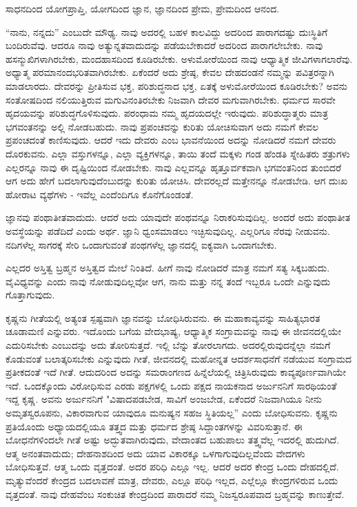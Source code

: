 ಸಾಧನದಿಂದ ಯೋಗಪ್ರಾಪ್ತಿ, ಯೋಗದಿಂದ ಜ್ಞಾನ, ಜ್ಞಾನದಿಂದ ಪ್ರೇಮ, ಪ್ರೇಮದಿಂದ ಆನಂದ.

“ನಾನು, ನನ್ನದು” ಎಂಬುದೇ ಮೌಢ್ಯ. ನಾವು ಅದರಲ್ಲಿ ಬಹಳ ಕಾಲವಿದ್ದು ಅದರಿಂದ ಪಾರಾಗದಷ್ಟು ದುಃಸ್ಥಿತಿಗೆ ಬಂದಿರುವೆವು. ಆದರೂ ನಾವು ಅತ್ಯುನ್ನತವಾದುದನ್ನು ಪಡೆಯಬೇಕಾದರೆ ಅದರಿಂದ ಪಾರಾಗಲೇಬೇಕು. ನಾವು ಹಸನ್ಮುಖಿಗಳಾಗಿರಬೇಕು, ಮಂದಹಾಸದಿಂದ ಕೂಡಿರಬೇಕು. ಅಳುಮೋರೆಯಿಂದ ನಾವು ಆಧ್ಯಾತ್ಮಿಕ ಜೀವಿಗಳಾಗಲಾರೆವು. ಅಧ್ಯಾತ್ಮ ಪರಮಾನಂದಭರಿತವಾಗಿರಬೇಕು. ಏಕೆಂದರೆ ಅದು ಶ್ರೇಷ್ಠ, ಕೇವಲ ದೇಹದಂಡನೆ ನಮ್ಮನ್ನು ಪವಿತ್ರರನ್ನಾಗಿ ಮಾಡಲಾರದು. ದೇವರನ್ನು ಪ್ರೀತಿಸುವ ಭಕ್ತ, ಪರಿಶುದ್ಧನಾದ ಭಕ್ತ, ಏತಕ್ಕೆ ಅಳುಮೋರೆಯಿಂದ ಕೂಡಿರಬೇಕು? ಅವನು ಸಂತೋಷದಿಂದ ನಲಿಯುತ್ತಿರುವ ಮಗುವಿನಂತಿರಬೇಕು ನಿಜವಾಗಿ ದೇವರ ಮಗುವಾಗಿರಬೇಕು. ಧರ್ಮದ ಸಾರವೇ ಹೃದಯವನ್ನು ಪರಿಶುದ್ಧಗೊಳಿಸುವುದು. ಪರಂಧಾಮ ನಮ್ಮ ಹೃದಯದಲ್ಲೇ ಇರುವುದು. ಪರಿಶುದ್ಧಾತ್ಮರು ಮಾತ್ರ ಭಗವಂತನನ್ನು ಅಲ್ಲಿ ನೋಡಬಹುದು. ನಾವು ಪ್ರಪಂಚವನ್ನು ಕುರಿತು ಯೋಚಿಸುವಾಗ ಅದು ನಮಗೆ ಕೇವಲ ಪ್ರಪಂಚದಂತೆ ಕಾಣಿಸುವುದು. ಆದರೆ ಇದು ದೇವರು ಎಂಬ ಭಾವನೆಯಿಂದ ಅದನ್ನು ನೋಡಿದರೆ ನಮಗೆ ದೇವರು ದೊರಕುವನು. ಎಲ್ಲಾ ವಸ್ತುಗಳನ್ನೂ, ಎಲ್ಲಾ ವ್ಯಕ್ತಿಗಳನ್ನೂ, ತಾಯಿ ತಂದೆ ಮಕ್ಕಳು ಗಂಡ ಹೆಂಡತಿ ಸ್ನೇಹಿತರು ಶತ್ರುಗಳು ಎಲ್ಲರನ್ನೂ ನಾವು ಈ ದೃಷ್ಟಿಯಿಂದ ನೋಡಬೇಕು. ನಾವು ಎಲ್ಲವನ್ನೂ ಹೃತ್ತೂರ್ವಕವಾಗಿ ಭಗವಂತನಿಂದ ತುಂಬಿದರೆ ಆಗ ಅದು ಹೇಗೆ ಬದಲಾಗುವುದೆಂಬುದನ್ನು ಕುರಿತು ಯೋಚಿಸಿ. ದೇವರಲ್ಲದೆ ಮತ್ತೇನನ್ನೂ ನೋಡಬೇಡಿ. ಆಗ ದುಃಖ ಹೋರಾಟ ವ್ಯಥೆಗಳು - ಇವೆಲ್ಲ ಎಂದೆಂದಿಗೂ ಕೊನೆಗೊಂಡಂತೆ.

ಜ್ಞಾನವು ಪಂಥಾತೀತವಾದುದು. ಆದರೆ ಅದು ಯಾವುದೇ ಪಂಥವನ್ನೂ ನಿರಾಕರಿಸುವುದಿಲ್ಲ. ಅಂದರೆ ಅದು ಪಂಥಾತೀತ ಅವಸ್ಥೆಯನ್ನು ಪಡೆದಿದೆ ಎಂದು ಅರ್ಥ. ಜ್ಞಾನಿ ಧ್ವಂಸಮಾಡಲು ಇಚ್ಛಿಸುವುದಿಲ್ಲ. ಎಲ್ಲರಿಗೂ ನೆರವು ನೀಡುವನು. ನದಿಗಳೆಲ್ಲ ಸಾಗರಕ್ಕೆ ಸೇರಿ ಒಂದಾಗುವಂತೆ ಪಂಥಗಳೆಲ್ಲ ಜ್ಞಾನದಲ್ಲಿ ಐಕ್ಯವಾಗಿ ಒಂದಾಗಬೇಕು.

ಎಲ್ಲದರ ಅಸ್ತಿತ್ವ ಬ್ರಹ್ಮನ ಅಸ್ತಿತ್ವದ ಮೇಲೆ ನಿಂತಿದೆ. ಹೀಗೆ ನಾವು ನೋಡಿದರೆ ಮಾತ್ರ ನಮಗೆ ಸತ್ಯ ಸಿಕ್ಕಬಹುದು. ವೈವಿಧ್ಯವನ್ನು ಎಂದು ನಾವು ನೋಡುವುದಿಲ್ಲವೋ ಆಗ, ನಾನು ಮತ್ತು ನನ್ನ ತಂದೆ ಇಬ್ಬರೂ ಒಂದೇ ಎನ್ನುವುದು ಗೊತ್ತಾಗುವುದು.

ಕೃಷ್ಣನು ಗೀತೆಯಲ್ಲಿ ಅತ್ಯಂತ ಸ್ಪಷ್ಟವಾಗಿ ಜ್ಞಾನವನ್ನು ಬೋಧಿಸಿರುವನು. ಈ ಮಹಾಕಾವ್ಯವನ್ನು ಸಾಹಿತ್ಯಭಾರತ ಚೂಡಾಮಣಿ ಎನ್ನುವರು. ಇದೊಂದು ಬಗೆಯ ವೇದಭಾಷ್ಯ, ಆಧ್ಯಾತ್ಮಿಕ ಸಂಗ್ರಾಮವನ್ನು ನಾವು ಈ ಜೀವನದಲ್ಲಿಯೇ ಎದುರಿಸಬೇಕು ಎಂಬುದನ್ನು ಅದು ತೋರಿಸುತ್ತದೆ. ಇಲ್ಲಿ ಬೆನ್ನು ತೋರಲಾಗದು. ಅದರಲ್ಲಿರುವುದನ್ನೆಲ್ಲಾ ನಮಗೆ ಕೊಡುವಂತೆ ಬಲಾತ್ಕರಿಸಬೇಕು ಎನ್ನುವುದು ಗೀತೆ, ಜೀವನದಲ್ಲಿ ಮಹೋನ್ನತ ಆದರ್ಶಸಾಧನೆಗೆ ನಡೆಯುವ ಸಂಗ್ರಾಮದ ಪ್ರತೀಕದಂತೆ ಇದೆ ಗೀತೆ. ಆದುದರಿಂದ ಅದನ್ನು ಸಮರಾಂಗಣದ ಹಿನ್ನೆಲೆಯಲ್ಲಿ ಚಿತ್ರಿಸಿರುವುದು ಕಾವ್ಯಪೂರ್ಣವಾಗಿಯೇ ಇದೆ. ಒಂದಕ್ಕೊಂದು ವಿರೋಧಿಸುವ ಎರಡು ಪಕ್ಷಗಳಲ್ಲಿ ಒಂದು ಪಕ್ಷದ ನಾಯಕನಾದ ಅರ್ಜುನನಿಗೆ ಸಾರಥಿಯಂತೆ ಇದ್ದ ಕೃಷ್ಣ. ಅವನು ಅರ್ಜುನನಿಗೆ "ವಿಷಾದಪಡಬೇಡ, ಸಾವಿಗೆ ಅಂಜಬೇಡ, ಏಕೆಂದರೆ ನಿಜವಾಗಿಯೂ ನೀನು ಅಮೃತಸ್ವರೂಪನು, ವಿಕಾರವಾಗುವ ಯಾವುದೂ ಮನುಷ್ಯನ ಸಹಜ ಸ್ಥಿತಿಯಲ್ಲ'' ಎಂದು ಬೋಧಿಸುವನು. ಕೃಷ್ಣನು ಪ್ರತಿಯೊಂದು ಅಧ್ಯಾಯದಲ್ಲಿಯೂ ತತ್ತ್ವದ ಮತ್ತು ಧರ್ಮದ ಶ್ರೇಷ್ಠ ಸಿದ್ದಾಂತಗಳನ್ನು ವಿವರಿಸುತ್ತಾನೆ. ಈ ಬೋಧನೆಗಳಿಂದಲೇ ಗೀತೆ ಅಷ್ಟು ಅದ್ಭುತವಾಗಿರುವುದು, ವೇದಾಂತದ ಬಹುಪಾಲು ತತ್ತ್ವವೆಲ್ಲ ಇದರಲ್ಲಿ ಹುದುಗಿದೆ. ಆತ್ಮ ಅನಂತವಾದುದು; ದೇಹನಾಶದಿಂದ ಅದು ಯಾವ ವಿಕಾರಕ್ಕೂ ಒಳಗಾಗುವುದಿಲ್ಲವೆಂದು ವೇದಗಳು ಬೋಧಿಸುತ್ತವೆ. ಆತ್ಮ ಒಂದು ವೃತ್ತದಂತೆ. ಅದರ ಪರಿಧಿ ಎಲ್ಲೂ ಇಲ್ಲ. ಆದರೆ ಅದರ ಕೇಂದ್ರ ಒಂದು ದೇಹದಲ್ಲಿದೆ. ಮೃತ್ಯುವೆಂದರೆ ಕೇಂದ್ರದ ಬದಲಾವಣೆ ಮಾತ್ರ, ದೇವರು, ಎಲ್ಲೂ ಪರಿಧಿ ಇಲ್ಲದ, ಎಲ್ಲೆಲ್ಲೂ ಕೇಂದ್ರಗಳಿರುವ ಒಂದು ವೃತ್ತದಂತೆ. ನಾವು ದೇಹವೆಂಬ ಸಂಕುಚಿತ ಕೇಂದ್ರದಿಂದ ಪಾರಾದರೆ ನಮ್ಮ ನಿಜಸ್ವರೂಪವಾದ ಬ್ರಹ್ಮವನ್ನು ಕಾಣುತ್ತೇವೆ.

